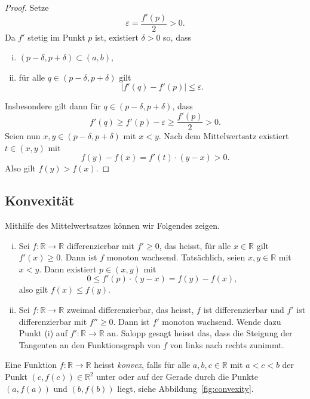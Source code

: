 \documentclass[../main.tex]{subfiles}
\begin{document}
\begin{proof}
  Setze
  \[
    \varepsilon = \frac{f'(p)}{2} > 0.
  \]
  Da $f'$ stetig im Punkt $p$ ist, existiert
  $\delta > 0$ so, dass
  \begin{enumerate}[(i)]
    \item $(p - \delta, p + \delta) \subset (a, b)$,
    \item für alle $q \in (p - \delta, p + \delta)$
      gilt
      \[
        |f'(q) - f'(p)| \leq \varepsilon.
      \]
  \end{enumerate}
  Insbesondere gilt dann für
  $q \in (p - \delta, p + \delta)$, dass
  \[
    f'(q) \geq f'(p) - \varepsilon \geq \frac{f'(p)}{2} > 0.
  \]
  Seien nun $x, y \in (p - \delta, p + \delta)$ mit
  $x < y$.
  Nach dem Mittelwertsatz existiert $t \in (x, y)$
  mit
  \[f(y)  - f(x) = f'(t) \cdot (y - x) > 0. \]
  Also gilt $f(y) > f(x)$.
\end{proof}

\subsection*{Konvexität}
Mithilfe des Mittelwertsatzes können wir Folgendes zeigen.
\begin{enumerate}[(i)]
  \item
    Sei $f \colon \mathbb{R} \to \mathbb{R}$ differenzierbar
    mit $f' \geq 0$, das heisst, für alle $x \in \mathbb{R}$
    gilt $f'(x) \geq 0$.
    Dann ist $f$ monoton wachsend.
    Tatsächlich, seien $x, y \in \mathbb{R}$ mit $x < y$.
    Dann existiert $p \in (x, y)$ mit
    \[
      0 \leq f'(p) \cdot (y - x) = f(y) - f(x),
    \]
    also gilt $f(x) \leq f(y)$.
  \item
    Sei $f \colon \mathbb{R} \to \mathbb{R}$ zweimal
    differenzierbar, das heisst, $f$ ist differenzierbar
    und $f'$ ist differenzierbar mit $f'' \geq 0$.
    Dann ist $f'$ monoton wachsend.
    Wende dazu Punkt (i) auf
    $f' \colon\mathbb{R} \to \mathbb{R}$
    an.
    Salopp gesagt heisst das,
    dass die Steigung der Tangenten an den
    Funktionsgraph von $f$ von links nach rechts
    zunimmt.
\end{enumerate}

\begin{definition}
  Eine Funktion $f \colon \mathbb{R} \to \mathbb{R}$
  heisst \emph{konvex}, falls für alle $a, b, c \in \mathbb{R}$
  mit $a < c < b$ der Punkt
  $(c, f(c))
  \in \mathbb{R}^2$ unter
  oder auf der Gerade durch die Punkte
  $(a, f(a))$ und $(b, f(b))$ liegt,
  siehe Abbildung~\ref{fig:convexity}.
\end{definition}
\end{document}
